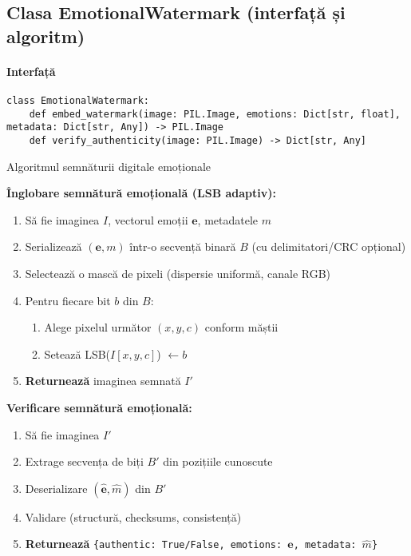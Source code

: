 \subsection{Clasa EmotionalWatermark (interfață și algoritm)}
\paragraph{Interfață}
\begin{verbatim}
class EmotionalWatermark:
    def embed_watermark(image: PIL.Image, emotions: Dict[str, float], metadata: Dict[str, Any]) -> PIL.Image
    def verify_authenticity(image: PIL.Image) -> Dict[str, Any]
\end{verbatim}

\begin{algorithm}[H]
\caption{Algoritmul semnăturii digitale emoționale}
\label{alg:c5-emotional_watermark}

\noindent\textbf{Înglobare semnătură emoțională (LSB adaptiv):}

\begin{enumerate}
\item Să fie imaginea $I$, vectorul emoții $\mathbf{e}$, metadatele $m$
\item Serializează $(\mathbf{e}, m)$ într-o secvență binară $B$ (cu delimitatori/CRC opțional)
\item Selectează o mască de pixeli (dispersie uniformă, canale RGB)
\item Pentru fiecare bit $b$ din $B$:
    \begin{enumerate}
    \item Alege pixelul următor $(x,y,c)$ conform măștii
    \item Setează LSB($I[x,y,c]$) $\leftarrow b$
    \end{enumerate}
\item \textbf{Returnează} imaginea semnată $I'$
\end{enumerate}

\noindent\textbf{Verificare semnătură emoțională:}

\begin{enumerate}
\item Să fie imaginea $I'$
\item Extrage secvența de biți $B'$ din pozițiile cunoscute
\item Deserializare $(\hat{\mathbf{e}}, \hat{m})$ din $B'$
\item Validare (structură, checksums, consistență)
\item \textbf{Returnează} \texttt{\{authentic: True/False, emotions: $\hat{\mathbf{e}}$, metadata: $\hat{m}$\}}
\end{enumerate}
\end{algorithm}

